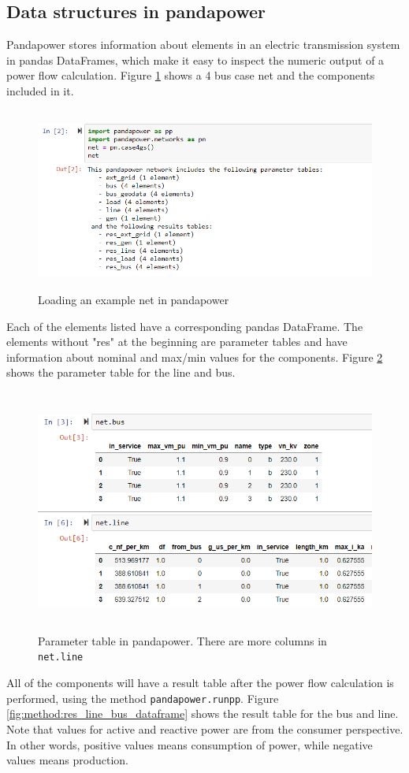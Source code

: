 \documentclass[class=book, crop=false]{standalone}
\begin{document}
\subsection{Data structures in pandapower}

Pandapower stores information about elements in an electric transmission system in pandas DataFrames, which make it easy to inspect the numeric output of a power flow calculation. Figure \ref{fig:method:loading_example_net} shows a 4 bus case net and the components included in it. 

\begin{figure}[H]
    \center
    \includegraphics[height=6cm, width=12cm]{figures/case4g_show_net.PNG}
    \caption[size = 9]{Loading an example net in pandapower}
    \label{fig:method:loading_example_net}
\end{figure}
Each of the elements listed have a corresponding pandas DataFrame. The elements without "res" at the beginning are parameter tables and have information about nominal and max/min values for the components. Figure \ref{fig:method:line_bus_dataframe} shows the parameter table for the line and bus.

\begin{figure}[H]
    \includegraphics[height=8cm, width=13.5cm]{figures/case4g_line_bus.PNG}
    \caption[size = 9]{Parameter table in pandapower. There are more columns in \texttt{net.line}}
    \label{fig:method:line_bus_dataframe}
\end{figure}
All of the components will have a result table after the power flow calculation is performed, using the method \texttt{pandapower.runpp}. Figure \ref{fig:method:res_line_bus_dataframe} shows the result table for the bus and line. Note that values for active and reactive power are from the consumer perspective. In other words, positive values means consumption of power, while negative values means production.
\end{document}
